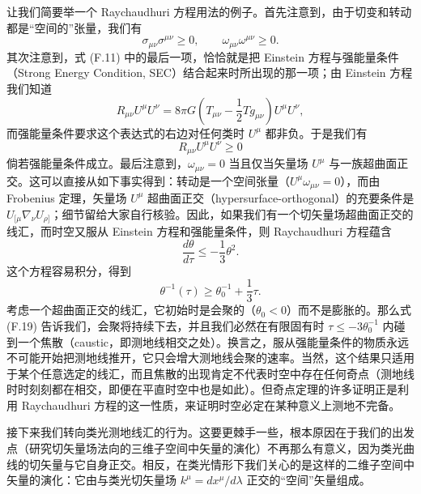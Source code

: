 让我们简要举一个 Raychaudhuri 方程用法的例子。首先注意到，由于切变和转动都是“空间的”张量，我们有
\begin{equation*}
\sigma_{\mu\nu}\sigma^{\mu\nu} \geq 0,\qquad \omega_{\mu\nu}\omega^{\mu\nu} \geq 0.
\tag{F.15}
\end{equation*}
其次注意到，式 (F.11) 中的最后一项，恰恰就是把 Einstein 方程与强能量条件（Strong Energy Condition, SEC）结合起来时所出现的那一项；由 Einstein 方程我们知道
\begin{equation*}
R_{\mu\nu}U^\mu U^\nu = 8\pi G\left(T_{\mu\nu} - \frac{1}{2}Tg_{\mu\nu}\right)U^\mu U^\nu,
\tag{F.16}
\end{equation*}
而强能量条件要求这个表达式的右边对任何类时 $U^\mu$ 都非负。于是我们有
\begin{equation*}
R_{\mu\nu}U^\mu U^\nu \geq 0
\tag{F.17}
\end{equation*}
倘若强能量条件成立。最后注意到，$\omega_{\mu\nu} = 0$ 当且仅当矢量场 $U^\mu$ 与一族超曲面正交。这可以直接从如下事实得到：转动是一个空间张量（$U^\mu\omega_{\mu\nu} = 0$），而由 Frobenius 定理，矢量场 $U^\mu$ 超曲面正交（hypersurface-orthogonal）的充要条件是 $U_{[\mu}\nabla_\nu U_{\rho]}$；细节留给大家自行核验。因此，如果我们有一个切矢量场超曲面正交的线汇，而时空又服从 Einstein 方程和强能量条件，则 Raychaudhuri 方程蕴含
\begin{equation*}
\frac{d\theta}{d\tau} \leq -\frac{1}{3}\theta^2.
\tag{F.18}
\end{equation*}
这个方程容易积分，得到
\begin{equation*}
\theta^{-1}(\tau) \geq \theta_0^{-1} + \frac{1}{3}\tau.
\tag{F.19}
\end{equation*}
考虑一个超曲面正交的线汇，它初始时是会聚的（$\theta_0 < 0$）而不是膨胀的。那么式 (F.19) 告诉我们，会聚将持续下去，并且我们必然在有限固有时 $\tau \leq -3\theta_0^{-1}$ 内碰到一个焦散（caustic，即测地线相交之处）。换言之，服从强能量条件的物质永远不可能开始把测地线推开，它只会增大测地线会聚的速率。当然，这个结果只适用于某个任意选定的线汇，而且焦散的出现肯定不代表时空中存在任何奇点（测地线时时刻刻都在相交，即便在平直时空中也是如此）。但奇点定理的许多证明正是利用 Raychaudhuri 方程的这一性质，来证明时空必定在某种意义上测地不完备。

接下来我们转向类光测地线汇的行为。这要更棘手一些，根本原因在于我们的出发点（研究切矢量场法向的三维子空间中矢量的演化）不再那么有意义，因为类光曲线的切矢量与它自身正交。相反，在类光情形下我们关心的是这样的二维子空间中矢量的演化：它由与类光切矢量场 $k^\mu = dx^\mu/d\lambda$ 正交的“空间”矢量组成。


